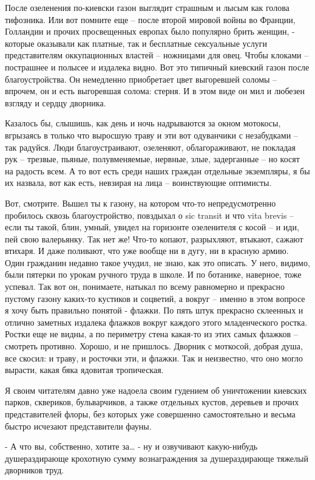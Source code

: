 После озеленения по-киевски газон выглядит страшным и лысым как голова
тифозника. Или вот помните еще – после второй мировой войны во Франции,
Голландии и прочих просвещенных европах было популярно брить женщин, - которые
оказывали как платные, так и бесплатные сексуальные услуги представителям
оккупационных властей – ножницами для овец. Чтобы клоками – пострашнее и
полысее и издалека видно. Вот это типичный киевский газон после
благоустройства. Он немедленно приобретает цвет выгоревшей соломы – впрочем, он
и есть выгоревшая солома: стерня. И в этом виде он мил и любезен взгляду и
сердцу дворника.

Казалось бы, слышишь, как день и ночь надрываются за окном мотокосы, вгрызаясь
в только что выросшую траву и эти вот одуванчики с незабудками – так радуйся.
Люди благоустраивают, озеленяют, облагораживают, не покладая рук – трезвые,
пьяные, полувменяемые, нервные, злые, задерганные – но косят на радость всем. А
то вот есть среди наших граждан отдельные экземпляры, я бы их назвала, вот как
есть, невзирая на лица – воинствующие оптимисты. 

Вот, смотрите. Вышел ты к газону, на котором что-то непредусмотренно пробилось
сквозь благоустройство, повздыхал о sic transit и что vita brevis – если ты
такой, блин, умный, увидел на горизонте озеленителя с косой – и иди, пей свою
валерьянку. Так нет же! Что-то копают, разрыхляют, втыкают, сажают втихаря. И
даже поливают, что уже вообще ни в дугу, ни в красную армию. Один гражданин
недавно такое учудил, не знаю, как это описать. У него, видимо, были пятерки по
урокам ручного труда в школе. И по ботанике, наверное, тоже успевал. Так вот
он, понимаете, натыкал по всему равномерно и прекрасно пустому газону каких-то
кустиков и соцветий, а вокруг – именно в этом вопросе я хочу быть правильно
понятой - флажки. По пять штук прекрасно склеенных и отлично заметных издалека
флажков вокруг каждого этого младенческого ростка. Ростки еще не видны, а по
периметру стена какая-то из этих самых флажков – смотреть противно. Хорошо, и
не пришлось. Дворник с моткосой, добрая душа, все скосил: и траву, и росточки
эти, и флажки. Так и неизвестно, что оно могло вырасти, какая бяка ядовитая
тропическая.

Я своим читателям давно уже надоела своим гудением об уничтожении киевских
парков, сквериков, бульварчиков, а также отдельных кустов, деревьев и прочих
представителей флоры, без которых уже совершенно самостоятельно и весьма быстро
исчезают представители фауны. 

- А что вы, собственно, хотите за… - ну и озвучивают какую-нибудь
душераздирающе крохотную сумму вознаграждения за душераздирающе тяжелый
дворников труд.

